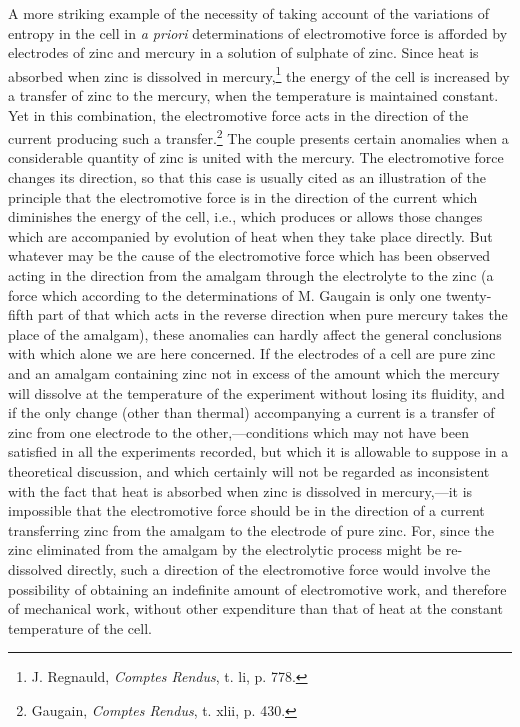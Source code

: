 \documentclass[12pt]{memoir}
\begin{document}
A more striking example of the necessity of taking account of the variations of entropy in the cell in \textit{a priori} determinations of electromotive force is afforded by electrodes of zinc and mercury in a solution of sulphate of zinc. Since heat is absorbed when zinc is dissolved in mercury,\footnote{J. Regnauld, \textit{Comptes Rendus}, t. li, p. 778.} the energy of the cell is increased by a transfer of zinc to the mercury, when the temperature is maintained constant. Yet in this combination, the electromotive force acts in the direction of the current producing such a transfer.\footnote{Gaugain, \textit{Comptes Rendus}, t. xlii, p. 430.} The couple presents certain anomalies when a considerable quantity of zinc is united with the mercury. The electromotive force changes its direction, so that this case is usually cited as an illustration of the principle that the electromotive force is in the direction of the current which diminishes the energy of the cell, i.e., which produces or allows those changes which are accompanied by evolution of heat when they take place directly. But whatever may be the cause of the electromotive force which has been observed acting in the direction from the amalgam through the electrolyte to the zinc (a force which according to the determinations of M. Gaugain is only one twenty-fifth part of that which acts in the reverse direction when pure mercury takes the place of the amalgam), these anomalies can hardly affect the general conclusions with which alone we are here concerned. If the electrodes of a cell are pure zinc and an amalgam containing zinc not in excess of the amount which the mercury will dissolve at the temperature of the experiment without losing its fluidity, and if the only change (other than thermal) accompanying a current is a transfer of zinc from one electrode to the other,---conditions which may not have been satisfied in all the experiments recorded, but which it is allowable to suppose in a theoretical discussion, and which certainly will not be regarded as inconsistent with the fact that heat is absorbed when zinc is dissolved in mercury,---it is impossible that the electromotive force should be in the direction of a current transferring zinc from the amalgam to the electrode of pure zinc. For, since the zinc eliminated from the amalgam by the electrolytic process might be re-dissolved directly, such a direction of the electromotive force would involve the possibility of obtaining an indefinite amount of electromotive work, and therefore of mechanical work, without other expenditure than that of heat at the constant temperature of the cell.
\end{document}
